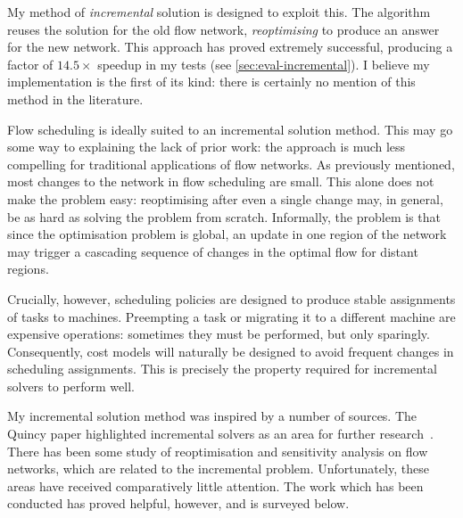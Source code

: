 My method of \emph{incremental} solution is designed to exploit this. The algorithm reuses the solution for the old flow network, \emph{reoptimising} to produce an answer for the new network. This approach has proved extremely successful, producing a factor of $14.5\times$ speedup in my tests (see \cref{sec:eval-incremental}). I believe my implementation is the first of its kind: there is certainly no mention of this method in the literature.

Flow scheduling is ideally suited to an incremental solution method. This may go some way to explaining the lack of prior work: the approach is much less compelling for traditional applications of flow networks. As previously mentioned, most changes to the network in flow scheduling are small. This alone does not make the problem easy: reoptimising after even a single change may, in general, be as hard as solving the problem from scratch\footnotemark. Informally, the problem is that since the optimisation problem is global, an update in one region of the network may trigger a cascading sequence of changes in the optimal flow for distant regions.

Crucially, however, scheduling policies are designed to produce stable assignments of tasks to machines. Preempting a task or migrating it to a different machine are expensive operations: sometimes they must be performed, but only sparingly. Consequently, cost models will naturally be designed to avoid frequent changes in scheduling assignments. This is precisely the property required for incremental solvers to perform well.

My incremental solution method was inspired by a number of sources. The Quincy paper highlighted incremental solvers as an area for further research~\cite[\S6.5]{Isard:2007}. There has been some study of reoptimisation and sensitivity analysis on flow networks, which are related to the incremental problem. Unfortunately, these areas have received comparatively little attention. The work which has been conducted has proved helpful, however, and is surveyed below.

